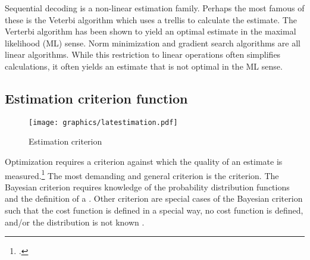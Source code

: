 Sequential decoding is a non-linear estimation family.
Perhaps the most famous of these is the Veterbi algorithm which
uses a trellis to calculate the estimate.
The Verterbi algorithm has been shown to yield an optimal estimate
in the maximal likelihood (ML) sense.
Norm minimization and gradient search algorithms are all linear algorithms.
While this restriction to linear operations often simplifies calculations,
it often yields an estimate that is not optimal in the ML sense.

\subsection{Estimation criterion function}
\label{sec:est_criterion}
\begin{figure}
\centering%
\texttt{[image: graphics/latestimation.pdf]}
\caption{
   Estimation criterion
   \label{fig:est-criterion}
   }
\end{figure}

Optimization requires a criterion against which the quality of an
estimate is measured.\footnote{.}
The most demanding and general criterion is the  criterion.
The Bayesian criterion requires knowledge of the probability
distribution functions and the definition of a .
Other criterion are special cases of the Bayesian criterion
such that the cost function is defined in a special way,
no cost function is defined, and/or the distribution is not known
.

